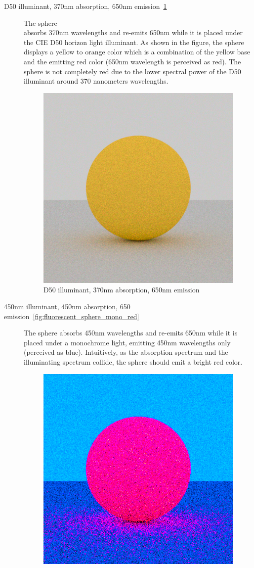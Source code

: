 \begin{description}
	\item[D50 illuminant, 370nm absorption, 650nm emission~\ref{fig:fluorescence_d50_red}] The sphere \\ absorbs 370nm wavelengths and re-emits 650nm while it is placed under the CIE D50 horizon light illuminant. As shown in the figure, the sphere displays a yellow to orange color which is a combination of the yellow base and the emitting red color (650nm wavelength is perceived as red). The sphere is not completely red due to the lower spectral power of the D50 illuminant around 370 nanometers wavelengths.
	\begin{figure}[H]
		\centering
		\includegraphics[width=.6\linewidth]{img/fluorescent_sphere_D50_red.png}
		\caption{D50 illuminant, 370nm absorption, 650nm emission}
		\label{fig:fluorescence_d50_red}
	\end{figure}
	\item[450nm illuminant, 450nm absorption, 650 emission~\ref{fig:fluorescent_sphere_mono_red}] The sphere absorbs 450nm wavelengths and re-emits 650nm while it is placed under a monochrome light, emitting 450nm wavelengths only (perceived as blue). Intuitively, as the absorption spectrum and the illuminating spectrum collide, the sphere should emit a bright red color.
	\begin{figure}[H]
		\centering
		\includegraphics[width=.6\linewidth]{img/fluorescent_sphere_mono_red.png}

\end{figure}
\end{description}

